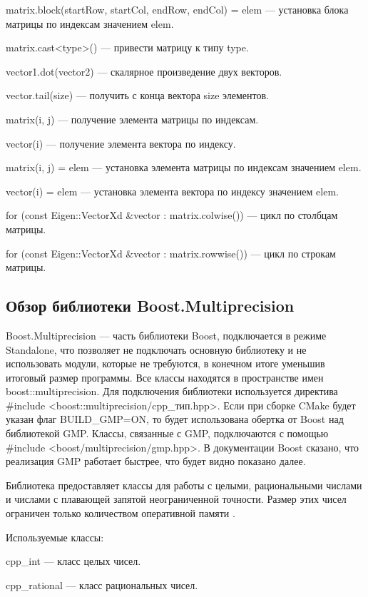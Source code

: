 matrix.block(startRow, startCol, endRow, endCol) = elem --- установка блока матрицы по индексам значением elem.

matrix.cast<type>() --- привести матрицу к типу type.

vector1.dot(vector2) --- скалярное произведение двух векторов.

vector.tail(size) --- получить с конца вектора size элементов.

matrix(i, j) --- получение элемента матрицы по индексам.

vector(i) --- получение элемента вектора по индексу.

matrix(i, j) = elem --- установка элемента матрицы по индексам значением elem.

vector(i) = elem --- установка элемента вектора по индексу значением elem.

for (const Eigen::VectorXd \&vector : matrix.colwise()) --- цикл по столбцам матрицы.

for (const Eigen::VectorXd \&vector : matrix.rowwise()) --- цикл по строкам матрицы.

\subsection{Обзор библиотеки Boost.Multiprecision}

Boost.Multiprecision --- часть библиотеки Boost, подключается в режиме Standalone, что позволяет не подключать основную библиотеку и не использовать модули, которые не требуются, в конечном итоге уменьшив итоговый размер программы. Все классы находятся в пространстве имен boost::multiprecision. Для подключения библиотеки используется директива \#include <boost::mul\-ti\-pre\-ci\-si\-on/cpp\_тип.hpp>. Если при сборке CMake будет указан флаг BUILD\_GMP=ON, то будет использована обертка от Boost над библиотекой GMP. Классы, связанные с GMP, подключаются с помощью \#include <boost/mul\-ti\-pre\-ci\-si\-on/gmp.hpp>. В документации Boost сказано, что реализация GMP работает быстрее, что будет видно показано далее.

Библиотека предоставляет классы для работы с целыми, рациональными числами и числами с плавающей запятой неограниченной точности. Размер этих чисел ограничен только количеством оперативной памяти \cite{BoostDoc}. 

Используемые классы:

cpp\_int --- класс целых чисел.

cpp\_rational --- класс рациональных чисел.

